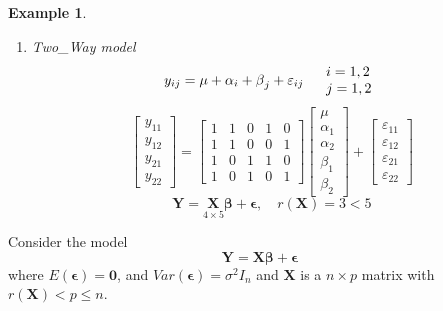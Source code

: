 \documentclass{article}
\newtheorem{example}[theorem]{Example}
\begin{document}
\begin{example}
\begin{enumerate}
\item Two\_Way model%
\begin{equation*}
y_{ij}=\mu +\alpha _{i}+\beta _{j}+\varepsilon _{ij}\quad 
\begin{tabular}{l}
$i=1,2$ \\ 
$j=1,2$%
\end{tabular}%
\end{equation*}%
\begin{equation*}
\left[ 
\begin{array}{c}
y_{11} \\ 
y_{12} \\ 
y_{21} \\ 
y_{22}%
\end{array}%
\right] =\left[ 
\begin{array}{ccccc}
1 & 1 & 0 & 1 & 0 \\ 
1 & 1 & 0 & 0 & 1 \\ 
1 & 0 & 1 & 1 & 0 \\ 
1 & 0 & 1 & 0 & 1%
\end{array}%
\right] \left[ 
\begin{array}{c}
\mu \\ 
\alpha _{1} \\ 
\alpha _{2} \\ 
\beta _{1} \\ 
\beta _{2}%
\end{array}%
\right] +\left[ 
\begin{array}{c}
\varepsilon _{11} \\ 
\varepsilon _{12} \\ 
\varepsilon _{21} \\ 
\varepsilon _{22}%
\end{array}%
\right]
\end{equation*}%
\newline
\newline
\begin{equation*}
\mathbf{Y=}\underset{4\times 5}{\mathbf{X}}\mathbf{\beta +\epsilon },\quad
r\left( \mathbf{X}\right) =3<5
\end{equation*}
\end{enumerate}
\end{example}

\bigskip

Consider the model%
\begin{equation*}
\mathbf{Y=X\beta +\epsilon }
\end{equation*}%
where $E\left( \mathbf{\epsilon }\right) =\mathbf{0}$, and $Var\left( 
\mathbf{\epsilon }\right) =\sigma ^{2}I_{n}$ and $\mathbf{X}$ is a $n\times
p $ matrix with $r\left( \mathbf{X}\right) <p\leq n$.
\end{document}
